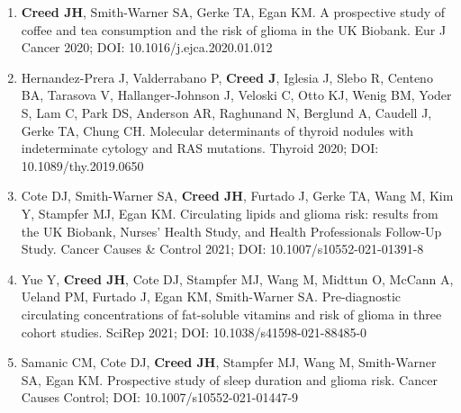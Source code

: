 \documentclass[11pt, a4paper]{article} %
\begin{document}
\begin{enumerate}[leftmargin=*]
\item{} {\bf Creed JH}, Smith-Warner SA, Gerke TA, Egan KM. A prospective study of coffee and tea consumption and the risk of glioma in the UK Biobank. Eur J Cancer 2020; DOI: 10.1016/j.ejca.2020.01.012

\item{} Hernandez-Prera J, Valderrabano P, {\bf Creed J}, Iglesia J, Slebo R, Centeno BA, Tarasova V, Hallanger-Johnson J, Veloski C, Otto KJ, Wenig BM, Yoder S, Lam C, Park DS, Anderson AR, Raghunand N, Berglund A, Caudell J, Gerke TA, Chung CH.  Molecular determinants of thyroid nodules with indeterminate cytology and RAS mutations. Thyroid 2020; DOI: 10.1089/thy.2019.0650

\item{} Cote DJ, Smith-Warner SA, {\bf Creed JH}, Furtado J, Gerke TA, Wang M, Kim Y, Stampfer MJ, Egan KM. Circulating lipids and glioma risk: results from the UK Biobank, Nurses’ Health Study, and Health Professionals Follow-Up Study. Cancer Causes \& Control 2021; DOI: 10.1007/s10552-021-01391-8

\item{} Yue Y, {\bf Creed JH}, Cote DJ, Stampfer MJ, Wang M, Midttun O, McCann A, Ueland PM, Furtado J, Egan KM, Smith-Warner SA. Pre-diagnostic circulating concentrations of fat-soluble vitamins and risk of glioma in three cohort studies. SciRep 2021; DOI: 10.1038/s41598-021-88485-0

\item{} Samanic CM, Cote DJ, {\bf Creed JH}, Stampfer MJ, Wang M, Smith-Warner SA, Egan KM. Prospective study of sleep duration and glioma risk. Cancer Causes Control; DOI: 10.1007/s10552-021-01447-9

\end{enumerate}
\end{document}
